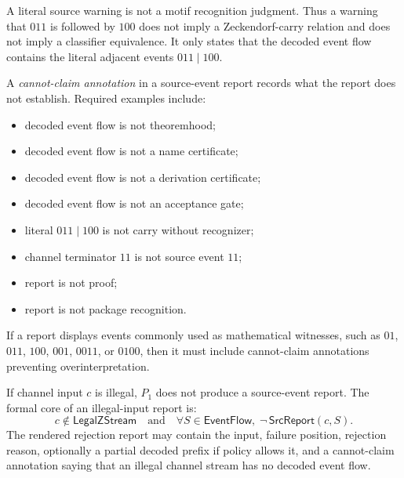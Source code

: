 \begin{principle}
\label{prin:source-report-warning-not-recognition}
A literal source warning is not a motif recognition judgment. Thus a warning that $011$ is followed by $100$ does not imply a Zeckendorf-carry relation and does not imply a classifier equivalence. It only states that the decoded event flow contains the literal adjacent events $011\mid 100$.
\end{principle}

\begin{definition}
\label{def:source-report-cannot-claim-annotation}
A \emph{cannot-claim annotation} in a source-event report records what the report does not establish. Required examples include:
\begin{itemize}
\item decoded event flow is not theoremhood;
\item decoded event flow is not a name certificate;
\item decoded event flow is not a derivation certificate;
\item decoded event flow is not an acceptance gate;
\item literal $011\mid 100$ is not carry without recognizer;
\item channel terminator $11$ is not source event $11$;
\item report is not proof;
\item report is not package recognition.
\end{itemize}
\end{definition}

\begin{principle}
\label{prin:source-report-nontrivial-cannot-claims}
If a report displays events commonly used as mathematical witnesses, such as $01$, $011$, $100$, $001$, $0011$, or $0100$, then it must include cannot-claim annotations preventing overinterpretation.
\end{principle}

\begin{definition}
\label{def:source-report-illegal-input}
If channel input $c$ is illegal, $P_1$ does not produce a source-event report. The formal core of an illegal-input report is:
$$
  c\notin\mathsf{LegalZStream}
  \quad\text{and}\quad
  \forall S\in\mathsf{EventFlow},\;
  \neg\,\mathsf{SrcReport}(c,S).
$$
The rendered rejection report may contain the input, failure position, rejection reason, optionally a partial decoded prefix if policy allows it, and a cannot-claim annotation saying that an illegal channel stream has no decoded event flow.
\end{definition}

